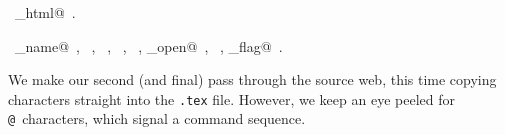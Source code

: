 \documentclass[a4paper]{report}
\begin{document}
\begin{flushleft}
\begin{minipage}{\linewidth}
\begin{list}{}{\setlength{\itemsep}{-\parsep}\setlength{\itemindent}{-\leftmargin}}
\item \NWtxtIdentsDefed\nobreak\  \verb@write_html@\nobreak\ .\item \NWtxtIdentsUsed\nobreak\  \verb@command_name@\nobreak\ , \verb@fclose@\nobreak\ , \verb@FILE@\nobreak\ , \verb@fopen@\nobreak\ , \verb@fprintf@\nobreak\ , \verb@source_open@\nobreak\ , \verb@stderr@\nobreak\ , \verb@verbose_flag@\nobreak\ .
\item{}
\end{list}
\end{minipage}\vspace{4ex}
\end{flushleft}
We make our second (and final) pass through the source web, this time
copying characters straight into the \verb|.tex| file. However, we keep
an eye peeled for \verb|@|~characters, which signal a command sequence.
\end{document}
